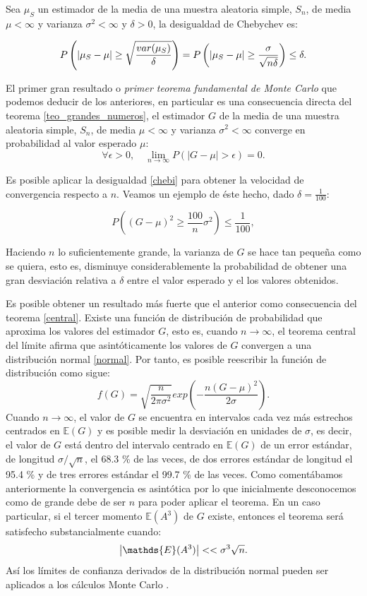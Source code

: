 \documentclass[../proyecto.tex]{memoir}
\begin{document}
\begin{defi} \label{chebi}
Sea $\mu_S$ un estimador de la media de una muestra aleatoria simple, $S_n$, de media $\mu < \infty$ y varianza $\sigma^2  < \infty$ y $\delta>0$, la desigualdad de Chebychev es:

$$
P \left( \abs{\mu_S-\mu} \geq \sqrt{\frac{var(\mu_S)}{\delta}} \right) = P \left( \abs{\mu_S-\mu} \geq \frac{\sigma}{\sqrt{n\delta}} \right)  \leq \delta.
$$

\end{defi}

El primer gran resultado o \textit{primer teorema fundamental de Monte Carlo} que podemos deducir de los anteriores, en particular es una consecuencia directa del teorema \ref{teo_grandes_numeros}, el estimador $G$ de la media de una muestra aleatoria simple, $S_n$, de media $\mu < \infty$ y varianza $\sigma^2 < \infty$ converge en probabilidad al valor esperado $\mu$:
$$
\forall \epsilon > 0,\quad \lim_{n\to\infty} P( |G - \mu|> \epsilon ) = 0.
$$

Es posible aplicar la desigualdad \ref{chebi} para obtener la velocidad de convergencia respecto a $n$. Veamos un ejemplo de éste hecho, dado $\delta=\frac{1}{100}$:

$$
P \left( ( G - \mu )^2 \geq \frac{100}{n} \sigma^2 \right)  \leq \frac{1}{100},
$$

Haciendo $n$ lo suficientemente grande, la varianza de $G$ se hace tan pequeña como se quiera, esto es, disminuye considerablemente la probabilidad de obtener una gran desviación relativa a $\delta$ entre el valor esperado y el los valores obtenidos.

Es posible obtener un resultado más fuerte que el anterior como consecuencia  del teorema \ref{central}. Existe una función de distribución de probabilidad que aproxima los valores del estimador $G$, esto es, cuando $n \to\infty$, el teorema central del límite afirma que asintóticamente los valores de $G$ convergen a una distribución normal \ref{normal}. Por tanto, es posible reescribir la función de distribución como sigue:
$$
f(G) = \sqrt{\frac{n}{2 \pi \sigma^2}} exp \left( - \frac{n(G-\mu)^2}{2\sigma} \right).
$$
Cuando $n \to\infty$, el valor de $G$ se encuentra en intervalos cada vez más estrechos centrados en $\mathds{E}(G)$ y es posible medir la desviación en unidades de $\sigma$, es decir, el valor de $G$ está dentro del intervalo centrado en $\mathds{E}(G)$ de un error estándar, de longitud $ \sigma / \sqrt{n} $, el 68.3 \% de las veces, de dos errores estándar de longitud el 95.4 \% y de tres errores estándar el 99.7 \%  de las veces. Como comentábamos anteriormente la convergencia es asintótica por lo que inicialmente desconocemos como de grande debe de ser $n$ para poder aplicar el teorema. En un caso particular, si el tercer momento $\mathds{E}(A^3)$ de $G$ existe, entonces el teorema será satisfecho substancialmente cuando:
$$
\abs{\mathds{E}(A^3)} << \sigma^3 \sqrt{n}.
$$
Así los límites de confianza derivados de la distribución normal pueden ser aplicados a los cálculos Monte Carlo \cite{fundamentos_montecarlo}.
\end{document}
